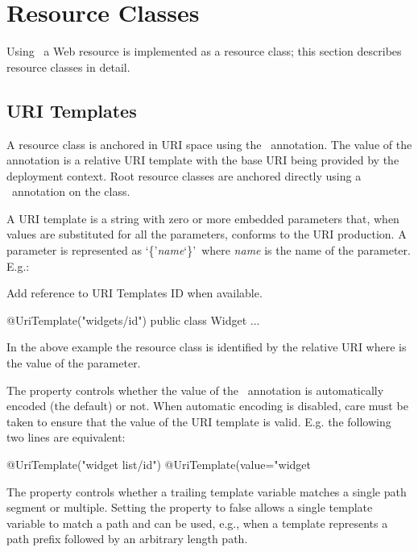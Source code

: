 \chapter{Resource Classes}
\label{resource_classes}

Using \jaxrs\, a Web resource is implemented as a resource class; this section describes resource classes in detail.

\section{URI Templates}

A resource class is anchored in URI space using the \UriTemplate\ annotation. The value of the annotation is a relative URI template with the base URI being provided by the deployment context. Root resource classes are anchored directly using a \UriTemplate\ annotation on the class.

A URI template is a string with zero or more embedded parameters that, when values are substituted for all the parameters, conforms to the URI\cite{uri} production. A parameter is represented as \lq\{\rq{\em name}\lq\}\rq\  where {\em name} is the name of the parameter. E.g.:

\begin{ednote}Add reference to URI Templates ID when available.\end{ednote}

\begin{listing}{1}
@UriTemplate("widgets/{id}")
public class Widget {
  ...
}\end{listing}

In the above example the  resource class is identified by the relative URI  where  is the value of the  parameter.

The  property controls whether the value of the \UriTemplate\ annotation is automatically encoded (the default) or not. When automatic encoding is disabled, care must be taken to ensure that the value of the URI template is valid. E.g. the following two lines are equivalent:

\begin{listing}{1}
@UriTemplate("widget list/{id}")
@UriTemplate(value="widget%
\end{listing}

The  property controls whether a trailing template variable matches a single path segment or multiple. Setting the property to false allows a single template variable to match a path and can be used, e.g., when a template represents a path prefix followed by an arbitrary length path.

